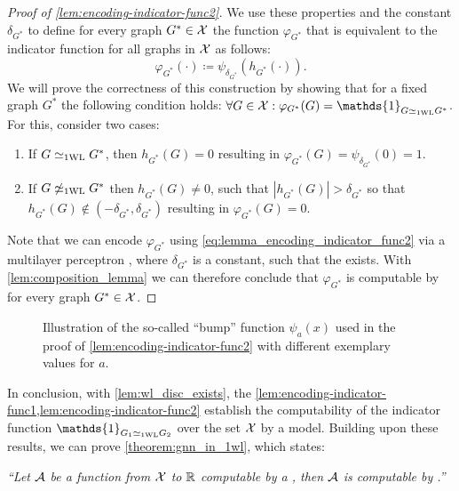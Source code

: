 \begin{proof}[Proof of \cref{lem:encoding-indicator-func2}]
    We use these properties and the constant $\delta_{G^*}$ to define for every graph ${G^*} \in \mathcal{X}$ the function $\varphi_{G^*}$ that is equivalent to the indicator function for all graphs in $\mathcal{X}$ as follows:
    \begin{equation*}
        \varphi_{G^*}(\cdot) \coloneqq \psi_{\delta_{G^*}} (h_{G^*}(\cdot)).
    \end{equation*}
    We will prove the correctness of this construction by showing that for a fixed graph $G^*$ the following condition holds: $\forall G 
    \in \cX: \varphi_{G^*}(G) = \mathds{1}_{G \wliso G^*}$. For this, consider two cases:
    \begin{enumerate}
        \item If $G \simeq_{\text{1WL}} G^*$, then $h_{G^*}(G) = 0$ resulting in $\varphi_{G^*}(G) = \psi_{\delta_{G^*}}(0) = 1$.
        \item If $G \not\simeq_{\text{1WL}} G^*$ then $h_{G^*}(G) \neq 0$, such that $|h_{G^*}(G)|> \delta_{G^*}$ so that $h_{G^*}(G) \not\in (-\delta_{G^*}, \delta_{G^*}) $ resulting in $\varphi_{G^*}(G) = 0$.
    \end{enumerate}
    Note that we can encode $\varphi_{G^*}$ using \cref{eq:lemma_encoding_indicator_func2} via a multilayer perceptron \mlp, where $\delta_{G^*}$ is a constant, such that the \mlp exists. With \cref{lem:composition_lemma} we can therefore conclude that $\varphi_{G^*}$ is computable by \wlnn for every graph ${G^*} \in \mathcal{X}$.
\end{proof}

\begin{figure}[!htb]
    \centering
    
    \caption{Illustration of the so-called ``bump'' function $\psi_a(x)$ used in the proof of \cref{lem:encoding-indicator-func2} with different exemplary values for $a$.}
    \label{fig:bump_function}
\end{figure}

In conclusion, with \cref{lem:wl_disc_exists}, the \cref{lem:encoding-indicator-func1,lem:encoding-indicator-func2} establish the computability of the indicator function $\mathds{1}_{G_1 \wliso G_2}$ over the set $\mathcal{X}$ by a \wlnn model. Building upon these results, we can prove \cref{theorem:gnn_in_1wl}, which states:
\begin{center}
    \noindent\textit{``Let $\mathcal{A}$ be a function from $\mathcal{X}$ to $\mathbb{R}$ computable by a \gnn, then $\mathcal{A}$ is computable by \wlnn.''}
\end{center}

